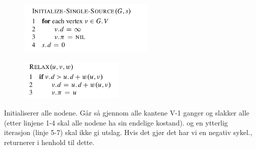 \documentclass[12pt]{report}
\begin{document}

\setlength{\parskip}{0.0pt}
\par




\begin{figure}[H]
	\begin{Center}
		\includegraphics[width=2.56in,height=1.01in]{./media/image128.png}
	\end{Center}
\end{figure}



\par




\begin{figure}[H]
	\begin{Center}
		\includegraphics[width=1.97in,height=0.77in]{./media/image124.png}
	\end{Center}
\end{figure}



\par


\vspace{\baselineskip}

\vspace{\baselineskip}
Initialiserer alle nodene. Går så gjennom alle kantene V-1 ganger og slakker alle (etter linjene 1-4 skal alle nodene ha sin endelige kostand). og en ytterlig iterasjon (linje 5-7) skal ikke gi utslag. Hvis det gjør det har vi en negativ sykel., returnerer i henhold til dette.\par
\end{document}
